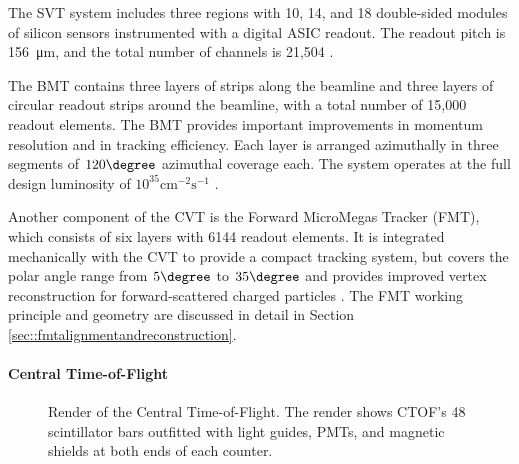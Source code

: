     The SVT system includes three regions with 10, 14, and 18 double-sided modules of silicon sensors instrumented with a digital ASIC readout.
    The readout pitch is \SI{156}{\micro\metre}, and the total number of channels is 21,504 \cite{antonioli2020}.

    The BMT contains three layers of strips along the beamline and three layers of circular readout strips around the beamline, with a total number of 15,000 readout elements.
    The BMT provides important improvements in momentum resolution and in tracking efficiency.
    Each layer is arranged azimuthally in three segments of $120\degree$ azimuthal coverage each.
    The system operates at the full design luminosity of $10^{35} \text{cm}^{-2}\text{s}^{-1}$ \cite{acker2020mvt}.

    Another component of the CVT is the Forward MicroMegas Tracker (FMT), which consists of six layers with 6144 readout elements.
    It is integrated mechanically with the CVT to provide a compact tracking system, but covers the polar angle range from $5\degree$ to $35\degree$ and provides improved vertex reconstruction for forward-scattered charged particles \cite{acker2020mvt}.
    The FMT working principle and geometry are discussed in detail in Section \ref{sec::fmtalignmentandreconstruction}.

\paragraph{Central Time-of-Flight}
    \begin{figure}
        \centering{}
        \caption[Central Time-of-Flight]{Render of the Central Time-of-Flight.
        The render shows CTOF's 48 scintillator bars outfitted with light guides, PMTs, and magnetic shields at both ends of each counter.}
        \label{fig::ctof}
    \end{figure}

